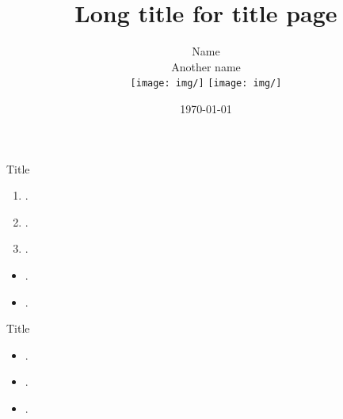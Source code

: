 \documentclass[aspectratio=1610,pdftex,dvipsnames,compress]{beamer}
\title[Short title for footer]{Long title for title page}
\author[Short author for footer]{
    Name\\
    \vspace{0.25in}
    Another name\\
    \vspace{0.05in}
    \texttt{[image: img/]} 
    \texttt{[image: img/]}
}
\institute[Short institute for footer]{
    \vspace{0.05in}
    Institution\\
    Subtitle\\
    \vspace{0.10in}
    Subtitle\\
    \vspace{0.15in}
    \texttt{[image: logo]}
    }
\date{\today}
\newcommand\blfootnote[1]{%
  \begingroup
  \renewcommand\thefootnote{}\footnote{#1}%
  \addtocounter{footnote}{-1}%
  \endgroup
}
\begin{document}
{
    \begin{frame}
        \titlepage
    \end{frame}
} 


\begin{frame}{Title}
    \begin{enumerate}[label=(\arabic*),leftmargin=*,itemsep=7pt]
        \item .
        \item .
        \item .
    \end{enumerate}
    \vspace{0.25in}
    \begin{itemize}[leftmargin=*,itemsep=7pt]
        \item .
        \item . 
    \end{itemize}
\end{frame}


\begin{frame}{Title}
    \begin{itemize}[leftmargin=*,itemsep=7pt]
        \item .  
        \item .
        \item .
    \end{itemize}
\end{frame}


%
%


\end{document}
